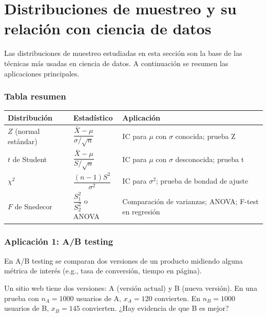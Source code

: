 \section{Distribuciones de muestreo y su relación con ciencia de datos}

Las distribuciones de muestreo estudiadas en esta secci\'on son la base de las
t\'ecnicas m\'as usadas en ciencia de datos. A continuaci\'on se resumen las
aplicaciones principales.

\subsubsection{Tabla resumen}

\begin{center}
\begin{tabular}{|l|l|l|}
\hline
\textbf{Distribuci\'on} & \textbf{Estad\'istico} & \textbf{Aplicaci\'on} \\
\hline
$Z$ (normal est\'andar) & $\dfrac{\bar{X}-\mu}{\sigma/\sqrt{n}}$
& IC para $\mu$ con $\sigma$ conocida; prueba Z \\
\hline
$t$ de Student & $\dfrac{\bar{X}-\mu}{S/\sqrt{n}}$
& IC para $\mu$ con $\sigma$ desconocida; prueba t \\
\hline
$\chi^2$ & $\dfrac{(n-1)S^2}{\sigma^2}$
& IC para $\sigma^2$; prueba de bondad de ajuste \\
\hline
$F$ de Snedecor & $\dfrac{S_1^2}{S_2^2}$ o ANOVA
& Comparaci\'on de varianzas; ANOVA; F-test en regresi\'on \\
\hline
\end{tabular}
\end{center}

\subsubsection{Aplicaci\'on 1: A/B testing}

En A/B testing se comparan dos versiones de un producto midiendo alguna m\'etrica
de inter\'es (e.g., tasa de conversi\'on, tiempo en p\'agina).

\begin{ejemplo}
 \label{exmp:3.2.7}
Un sitio web tiene dos versiones: A (versi\'on actual) y B (nueva versi\'on). En
una prueba con $n_A = 1000$ usuarios de A, $x_A = 120$ convierten. En $n_B = 1000$
usuarios de B, $x_B = 145$ convierten. ¿Hay evidencia de que B es mejor?
\end{ejemplo}

